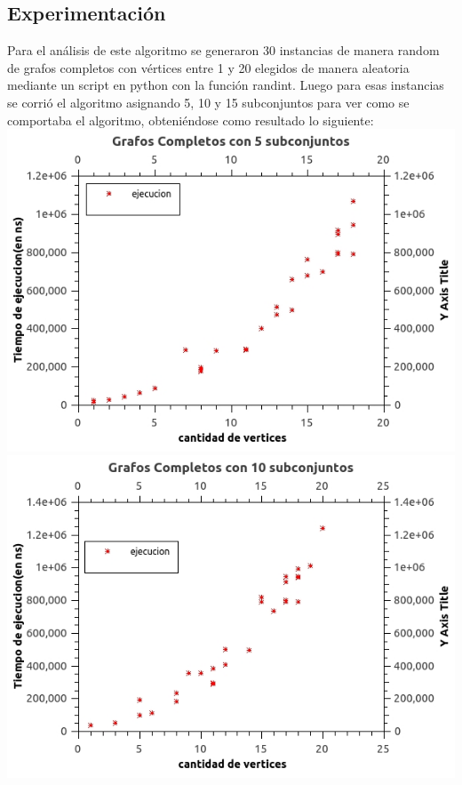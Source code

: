 \subsection{Experimentación}
Para el análisis de este algoritmo se generaron 30 instancias de manera random de grafos completos con vértices entre 1 y 20 elegidos de manera aleatoria mediante un script en python con la función randint.
Luego para esas instancias se corrió el algoritmo asignando 5, 10 y 15 subconjuntos para ver como se comportaba el algoritmo, obteniéndose como resultado lo siguiente:\\
\includegraphics[scale=0.5]{Ej2/k5.jpg}
\includegraphics[scale=0.5]{Ej2/k10.jpg}\\
